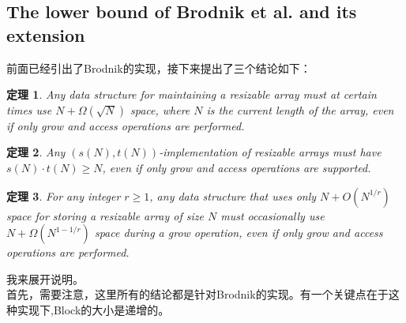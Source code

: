 \documentclass[12pt,a4paper]{article}
\newtheorem{theorem}{定理}[section]
\begin{document}
\subsection{The lower bound of Brodnik et al. and its extension}
前面已经引出了Brodnik的实现，接下来提出了三个结论如下：
\begin{theorem}
Any data structure for maintaining a resizable array must at certain times use $N+\Omega(\sqrt{N})$ space, where $N$ is the current length of the array, even if only grow and access operations are performed.
\end{theorem}
\begin{theorem}
Any $(s(N),t(N))$-implementation of resizable arrays must have $s(N) \cdot t(N) \ge N$, even if only grow and access operations are supported.
\end{theorem}
\begin{theorem}
For any integer $r \ge 1$, any data structure that uses only $N+O(N^{1/r})$ space for storing a resizable array of size $N$ must occasionally use $N+\Omega(N^{1-1/r})$ space during a grow operation, even if only grow and access operations are performed.
\end{theorem}
我来展开说明。\\
首先，需要注意，这里所有的结论都是针对Brodnik的实现。有一个关键点在于这种实现下,Block的大小是递增的。\\
\end{document}

